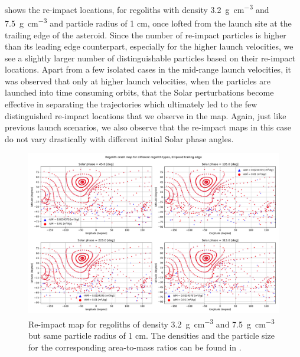  shows the re-impact locations, for regoliths with density \SI{3.2}{\gram\per\centi\metre\cubed} and \SI{7.5}{\gram\per\centi\metre\cubed} and particle radius of 1 cm, once lofted from the launch site at the trailing edge of the asteroid. Since the number of re-impact particles is higher than its leading edge counterpart, especially for the higher launch velocities, we see a slightly larger number of distinguishable particles based on their re-impact locations. Apart from a few isolated cases in the mid-range launch velocities, it was observed that only at higher launch velocities, when the particles are launched into time consuming orbits, that the Solar perturbations become effective in separating the trajectories which ultimately led to the few distinguished re-impact locations that we observe in the map. Again, just like previous launch scenarios, we also observe that the re-impact maps in this case do not vary drastically with different initial Solar phase angles.
\begin{figure}[htb]
\centering
\captionsetup{justification=centering}
\includegraphics[angle=90, width=\textwidth, height=\textheight, keepaspectratio=true]{trailing_edge_perturbations/crashMap_3P2_7P5_density_1cm_radius.pdf}
\caption{Re-impact map for regoliths of density \SI{3.2}{\gram\per\centi\metre\cubed} and \SI{7.5}{\gram\per\centi\metre\cubed} but same particle radius of 1 cm. The densities and the particle size for the corresponding area-to-mass ratios can be found in .}
\label{fig:trailingEdge_crashmap_3P2_7P5_density_1cm_radius}
\end{figure}
\FloatBarrier
